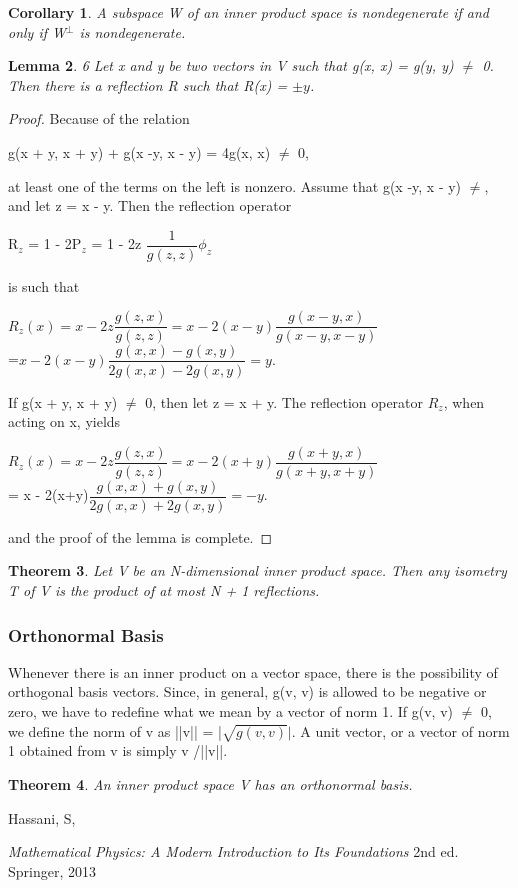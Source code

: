\documentclass[12pt,a4paper]{article}
\newtheorem{thm}{Theorem}
\newtheorem{lem}[thm]{Lemma}
\newtheorem{cor}[thm]{Corollary}
\begin{document}
\begin{cor}
A subspace W of an inner product space is nondegenerate if and only if W$^\perp$ is nondegenerate.
\end{cor}
\begin{lem}
6 Let x and y be two vectors in V such that g(x, x) =
g(y, y) $\ne$ 0. Then there is a reflection R such that R(x) = $\pm y$.
\end{lem}
\begin{proof}
Because of the relation
\begin{center}
g(x + y, x + y) + g(x -y, x - y) = 4g(x, x) $\ne$ 0,
\end{center}
at least one of the terms on the left is nonzero. Assume that g(x -y, x - y) $\ne$, and let z = x - y. Then the reflection operator
\begin{center}
R$_z$ = 1 - 2P$_z$ = 1 - 2z $\dfrac{1}{g(z, z)} \phi_z$
\end{center}
is such that 
\begin{center}
$R_z(x) = x - 2z\dfrac{g(z,x)}{g(z,z)} = x - 2(x-y)\dfrac{g(x - y, x)}{g(x - y, x -y)}$\\
=$x - 2(x-y)\dfrac{g(x,x) - g(x, y)}{2g(x,x) - 2g(x,y)} = y.$
\end{center}
If g(x + y, x + y) $\neq$ 0, then let z = x + y. The reflection operator $R_z$, when acting on x, yields
\begin{center}
$R_z(x) = x - 2z\dfrac{g(z,x)}{g(z,z)} = x - 2(x + y)\dfrac{g(x+y,x)}{g(x+y, x+y)}$\\
= x - 2(x+y)$\dfrac{g(x,x) + g(x,y)}{2g(x,x) + 2g(x,y)} = -y.$
\end{center}
and the proof of the lemma is complete. 
\end{proof}
\begin{thm}
Let V be an N-dimensional inner product space.
Then any isometry T of V is the product of at most N + 1 reflections.
\end{thm}
\subsubsection{Orthonormal Basis}
Whenever there is an inner product on a vector space, there is the possibility
of orthogonal basis vectors. Since, in general, g(v, v) is allowed to be negative or zero, we have to redefine what we mean by a vector of norm 1. If
g(v, v) $\ne$ 0, we define the norm of v as ||v|| = |$\sqrt{g(v,v)}|$. A unit vector, or
a vector of norm 1 obtained from v is simply v /||v||.
\begin{thm}
An inner product space V has an orthonormal basis.
\end{thm}




\newpage
\begin{thebibliography}{9}

  Hassani, S,

  \emph{Mathematical Physics: A Modern Introduction to Its Foundations}  2nd ed. Springer, 2013



\end{thebibliography}
\end{document}
